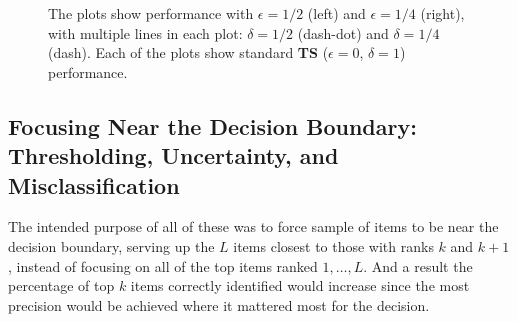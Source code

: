 \documentclass[nonblindrev]{informs3}
\newcommand{\ts}{\textbf{TS} }
\newcommand{\numperset}{L}
\begin{document}
\begin{figure}
\caption{The plots show performance with $\epsilon = 1/2$ (left) and $\epsilon = 1/4$ (right), with multiple lines in each plot: $\delta = 1/2$ (dash-dot) and $\delta = 1/4$ (dash). Each of the plots show standard \ts ($\epsilon = 0$, $\delta =1$) performance.}
\label{fig:effects_epsilon_delta}
 	\begin{center}
    \qquad
    \end{center}
\end{figure}


\subsection{Focusing Near the Decision Boundary: Thresholding, Uncertainty, and Misclassification}

The intended purpose of all of these was to force sample of items to be near the decision boundary, serving up the $\numperset$ items closest to those with ranks $k$ and $k+1$, instead of focusing on all of the top items ranked $1,\ldots,\numperset$. And a result the percentage of top $k$ items correctly identified would increase since the most precision would be achieved where it mattered most for the decision. 
\end{document}
